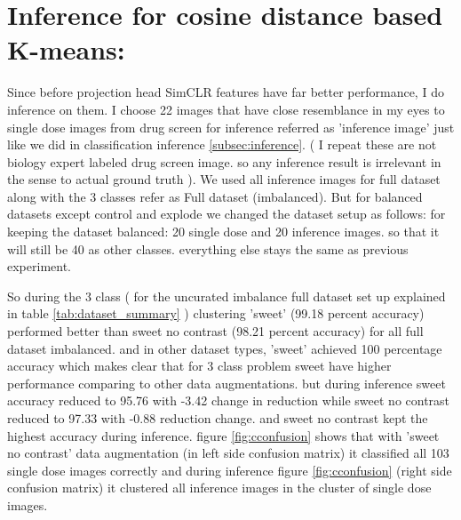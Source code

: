 \section{Inference for cosine distance based K-means:}
Since before projection head SimCLR features have far better performance, I do  inference on them. I choose 22 images that have close resemblance in my eyes to single dose images from drug screen for inference referred as 'inference image' just like we did in classification inference \ref{subsec:inference}. ( I repeat these are not biology expert labeled drug screen image. so any inference result is irrelevant in the sense to actual ground truth ). We used all inference images for full dataset along with the 3 classes refer as Full dataset (imbalanced). But for balanced datasets except control and explode
 we changed the  dataset setup as follows: for keeping the dataset balanced: 20 single dose and 20 inference images. so that it will still be 40 as other classes. everything else stays the same as previous experiment.

So during the 3 class ( for the uncurated imbalance full dataset set up explained in table \ref{tab:dataset_summary} ) clustering 'sweet' (99.18 percent accuracy) performed better than sweet no contrast (98.21 percent accuracy) for all full dataset imbalanced. and in other dataset types, 'sweet' achieved 100 percentage accuracy which makes clear that for 3 class problem sweet have higher performance comparing to other data augmentations. but during inference sweet accuracy reduced to 95.76  with -3.42 change in reduction while sweet no contrast reduced to  97.33 with -0.88 reduction change. and sweet no contrast kept the highest accuracy during inference. figure \ref{fig:cconfusion} shows that with 'sweet no contrast' data augmentation (in left side confusion matrix) it classified all 103 single dose images correctly and during inference figure \ref{fig:cconfusion} (right side confusion matrix) it clustered all inference images in the cluster of single dose images.

